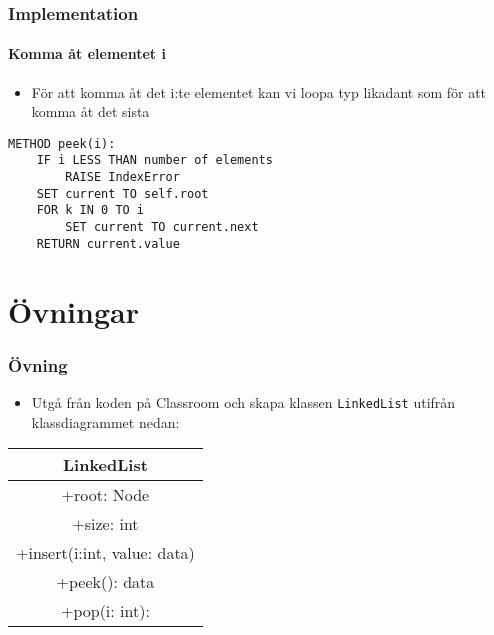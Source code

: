 \documentclass[aspectratio=169]{beamer}
\begin{document}
\begin{frame}[fragile]
	\frametitle{Implementation}
	\framesubtitle{Komma åt elementet i}
	
	\begin{itemize}
		\item För att komma åt det i:te elementet kan vi loopa typ likadant som för att komma åt det sista
	\end{itemize}
	
	\begin{lstlisting}
METHOD peek(i):
    IF i LESS THAN number of elements
        RAISE IndexError
    SET current TO self.root
    FOR k IN 0 TO i
        SET current TO current.next
    RETURN current.value
	\end{lstlisting}
	
\end{frame}

\section{Övningar}

\begin{frame}[fragile]
	\frametitle{Övning}
	
	\begin{itemize}
		\item Utgå från koden på Classroom och skapa klassen \texttt{LinkedList} utifrån klassdiagrammet nedan:
	\end{itemize}
	
	\begin{center}	
		\begin{tabular}{|c|}
			\hline 
			LinkedList  \\ \hline
			+root: Node\\
			+size: int \\ \hline
			+insert(i:int, value: data) \\
			+peek(): data \\
			+pop(i: int):\\ \hline
		\end{tabular}
	\end{center}
	
\end{frame}
\end{document}
